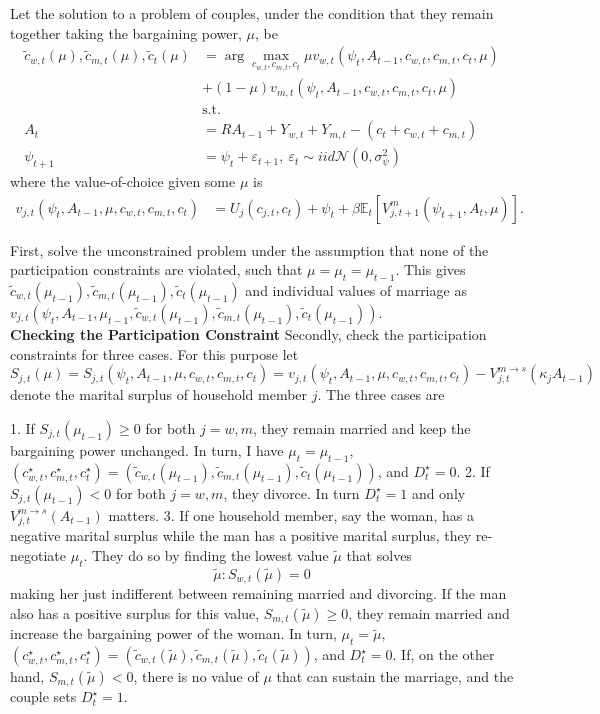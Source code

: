 \documentclass{article}
\begin{document}
Let the solution to a problem of couples, under the condition that
they remain together taking the bargaining power, $\mu$, be
\begin{align*}
\tilde{c}_{w,t}(\mu),\tilde{c}_{m,t}(\mu),\tilde{c}_{t}(\mu) & =\arg\max_{c_{w,t},c_{m,t},c_{t}}\mu v_{w,t}(\psi_{t},A_{t-1},c_{w,t},c_{m,t},c_{t},\mu)\\
 & +(1-\mu)v_{m,t}(\psi_{t},A_{t-1},c_{w,t},c_{m,t},c_{t},\mu)\\
 & \text{s.t.}\\
A_{t} & =RA_{t-1}+Y_{w,t}+Y_{m,t}-(c_{t}+c_{w,t}+c_{m,t})\\
\psi_{t+1} & =\psi_{t}+\varepsilon_{t+1},\:\varepsilon_{t}\sim iid\mathcal{N}(0,\sigma_{\psi}^{2})
\end{align*}
where the value-of-choice given some $\mu$ is
\begin{align}
v_{j,t}(\psi_{t},A_{t-1},\mu,c_{w,t},c_{m,t},c_{t}) & =U_{j}(c_{j,t},c_{t})+\psi_{t}+\beta\mathbb{E}_{t}[V_{j,t+1}^{m}(\psi_{t+1},A_{t},\mu)].
\end{align}

First, solve the unconstrained problem under the assumption that none
of the participation constraints are violated, such that $\mu=\mu_{t}=\mu_{t-1}$.
This gives $\tilde{c}_{w,t}(\mu_{t-1}),\tilde{c}_{m,t}(\mu_{t-1}),\tilde{c}_{t}(\mu_{t-1})$
and individual values of marriage as $v_{j,t}(\psi_{t},A_{t-1},\mu_{t-1},\tilde{c}_{w,t}(\mu_{t-1}),\tilde{c}_{m,t}(\mu_{t-1}),\tilde{c}_{t}(\mu_{t-1}))$. 
\\
\textbf{Checking the Participation Constraint}
Secondly, check the participation constraints for three cases. For
this purpose let 
$$
S_{j,t}(\mu)=S_{j,t}(\psi_{t},A_{t-1},\mu,c_{w,t},c_{m,t},c_{t})=v_{j,t}(\psi_{t},A_{t-1},\mu,c_{w,t},c_{m,t},c_{t})-V_{j,t}^{m\rightarrow s}(\kappa_{j}A_{t-1})
$$
denote the marital surplus of household member $j$. The three cases
are

1. If $S_{j,t}(\mu_{t-1})\geq0$ for both $j=w,m$, they remain married
and keep the bargaining power unchanged. In turn, I  have $\mu_{t}=\mu_{t-1}$,
$(c_{w,t}^{\star},c_{m,t}^{\star},c_{t}^{\star})=(\tilde{c}_{w,t}(\mu_{t-1}),\tilde{c}_{m,t}(\mu_{t-1}),\tilde{c}_{t}(\mu_{t-1}))$,
and $D_{t}^{\star}=0$.
2. If $S_{j,t}(\mu_{t-1})<0$ for both $j=w,m$, they divorce. In turn
$D_{t}^{\star}=1$ and only $V_{j,t}^{m\rightarrow s}(A_{t-1})$ matters.
3. If one household member, say the woman, has a negative marital surplus
while the man has a positive marital surplus, they re-negotiate $\mu_{t}$.
They do so by finding the lowest value $\tilde{\mu}$ that solves $$ \tilde{\mu}:S_{w,t}(\tilde{\mu})=0 $$ 
making her just indifferent between remaining married and divorcing.
If the man also has a positive surplus for this value, $S_{m,t}(\tilde{\mu})\geq0$,
they remain married and increase the bargaining power of the woman.
In turn, $\mu_{t}=\tilde{\mu}$, $(c_{w,t}^{\star},c_{m,t}^{\star},c_{t}^{\star})=(\tilde{c}_{w,t}(\tilde{\mu}),\tilde{c}_{m,t}(\tilde{\mu}),\tilde{c}_{t}(\tilde{\mu}))$,
and $D_{t}^{\star}=0$. If, on the other hand, $S_{m,t}(\tilde{\mu})<0$,
there is no value of $\mu$ that can sustain the marriage, and the
couple sets $D_{t}^{\star}=1$.
\end{document}
